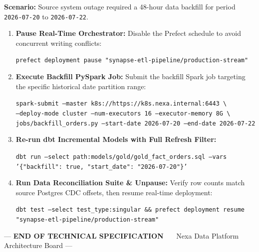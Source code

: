 \documentclass[10pt, a4paper]{article}
\begin{document}
\begin{tcolorbox}[basebox, title=\faCogs\ DataOps Operational Backfill Procedure]
\scriptsize
\textbf{Scenario:} Source system outage required a 48-hour data backfill for period \texttt{2026-07-20} to \texttt{2026-07-22}.

\begin{enumerate}[leftmargin=1.5em, itemsep=2pt]
    \item \textbf{Pause Real-Time Orchestrator:}
    Disable the Prefect schedule to avoid concurrent writing conflicts:
    \begin{center}
    \texttt{\scriptsize prefect deployment pause "synapse-etl-pipeline/production-stream"}
    \end{center}

    \item \textbf{Execute Backfill PySpark Job:}
    Submit the backfill Spark job targeting the specific historical date partition range:
    \begin{center}
    \texttt{\scriptsize spark-submit --master k8s://https://k8s.nexa.internal:6443 \textbackslash{}} \\
    \texttt{\scriptsize \quad --deploy-mode cluster --num-executors 16 --executor-memory 8G \textbackslash{}} \\
    \texttt{\scriptsize \quad jobs/backfill\_orders.py --start-date 2026-07-20 --end-date 2026-07-22}
    \end{center}

    \item \textbf{Re-run dbt Incremental Models with Full Refresh Filter:}
    \begin{center}
    \texttt{\scriptsize dbt run --select path:models/gold/gold\_fact\_orders.sql --vars '\{"backfill": true, "start\_date": "2026-07-20"\}'}
    \end{center}

    \item \textbf{Run Data Reconciliation Suite \& Unpause:}
    Verify row counts match source Postgres CDC offsets, then resume real-time deployment:
    \begin{center}
    \texttt{\scriptsize dbt test --select test\_type:singular \&\& prefect deployment resume "synapse-etl-pipeline/production-stream"}
    \end{center}
\end{enumerate}
\end{tcolorbox}

\vspace{4pt}

\begin{center}
    \textcolor{SubtleGray}{\small --- \textbf{END OF TECHNICAL SPECIFICATION} \ \textbar\ \ Nexa Data Platform Architecture Board ---}
\end{center}
\end{document}
